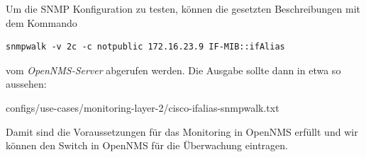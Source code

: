 Um die SNMP Konfiguration zu testen, können die gesetzten Beschreibungen mit dem Kommando

\begin{lstlisting}[numbers=none]
snmpwalk -v 2c -c notpublic 172.16.23.9 IF-MIB::ifAlias
\end{lstlisting}

vom \textit{OpenNMS-Server} abgerufen werden. Die Ausgabe sollte dann in etwa so aussehen:


  {configs/use-cases/monitoring-layer-2/cisco-ifalias-snmpwalk.txt}

Damit sind die Voraussetzungen für das Monitoring in OpenNMS erfüllt und wir können den Switch in OpenNMS für die Überwachung eintragen.

